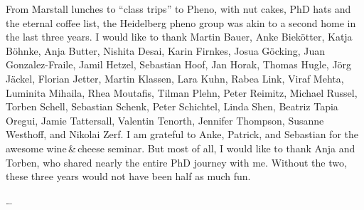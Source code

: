 From Marstall lunches to ``class trips'' to Pheno, with nut cakes, PhD
hats and the eternal coffee list, the Heidelberg pheno group was akin
to a second home in the last three years. I would like to thank Martin
Bauer, Anke Biek\"otter, Katja B\"ohnke, Anja Butter, Nishita Desai,
Karin Firnkes, Josua G\"ocking, Juan Gonzalez-Fraile, Jamil Hetzel,
Sebastian Hoof, Jan Horak, Thomas Hugle, J\"org J\"ackel, Florian
Jetter, Martin Klassen, Lara Kuhn, Rabea Link, Viraf Mehta, Luminita
Mihaila, Rhea Moutafis, Tilman Plehn, Peter Reimitz, Michael Russel,
Torben Schell, Sebastian Schenk, Peter Schichtel, Linda Shen, Beatriz
Tapia Oregui, Jamie Tattersall, Valentin Tenorth, Jennifer Thompson,
Susanne Westhoff, and Nikolai Zerf. I am grateful to Anke, Patrick,
and Sebastian for the awesome wine\,\&\,cheese seminar. But most of
all, I would like to thank Anja and Torben, who shared nearly the
entire PhD journey with me. Without the two, these three years would
not have been half as much fun.

\dots 



